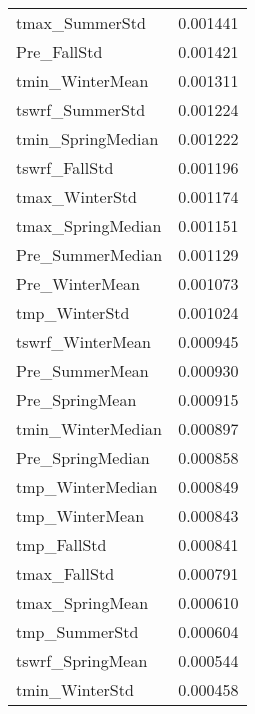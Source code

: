\begin{tabular}{lr}
tmax_SummerStd & 0.001441 \\
Pre_FallStd & 0.001421 \\
tmin_WinterMean & 0.001311 \\
tswrf_SummerStd & 0.001224 \\
tmin_SpringMedian & 0.001222 \\
tswrf_FallStd & 0.001196 \\
tmax_WinterStd & 0.001174 \\
tmax_SpringMedian & 0.001151 \\
Pre_SummerMedian & 0.001129 \\
Pre_WinterMean & 0.001073 \\
tmp_WinterStd & 0.001024 \\
tswrf_WinterMean & 0.000945 \\
Pre_SummerMean & 0.000930 \\
Pre_SpringMean & 0.000915 \\
tmin_WinterMedian & 0.000897 \\
Pre_SpringMedian & 0.000858 \\
tmp_WinterMedian & 0.000849 \\
tmp_WinterMean & 0.000843 \\
tmp_FallStd & 0.000841 \\
tmax_FallStd & 0.000791 \\
tmax_SpringMean & 0.000610 \\
tmp_SummerStd & 0.000604 \\
tswrf_SpringMean & 0.000544 \\
tmin_WinterStd & 0.000458 \\
\bottomrule
\end{tabular}
